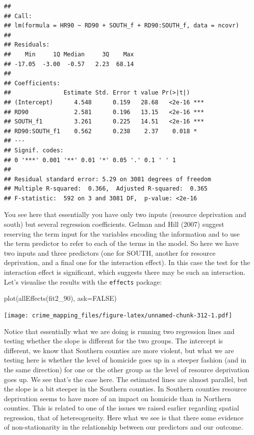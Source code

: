\documentclass[
  krantz2]{krantz}
\makeatletter
\newenvironment{Shaded}{\begin{snugshade}}{\end{snugshade}}
\newcommand{\AttributeTok}[1]{\textcolor[rgb]{0.61,0.61,0.61}{#1}}
\newcommand{\ConstantTok}[1]{\textcolor[rgb]{0,0,0}{#1}}
\newcommand{\FunctionTok}[1]{\textcolor[rgb]{0,0,0}{#1}}
\newcommand{\NormalTok}[1]{#1}
\newenvironment{kframe}{%
\medskip{}
\setlength{\fboxsep}{.8em}
 \def\at@end@of@kframe{}%
 \ifinner\ifhmode%
  \def\at@end@of@kframe{\end{minipage}}%
  \begin{minipage}{\columnwidth}%
 \fi\fi%
 \def\FrameCommand##1{\hskip\@totalleftmargin \hskip-\fboxsep
 \colorbox{shadecolor}{##1}\hskip-\fboxsep
     \hskip-\linewidth \hskip-\@totalleftmargin \hskip\columnwidth}%
 \MakeFramed {\advance\hsize-\width
   \@totalleftmargin\z@ \linewidth\hsize
   \@setminipage}}%
 {\par\unskip\endMakeFramed%
 \at@end@of@kframe}
\renewenvironment{Shaded}{\begin{kframe}}{\end{kframe}}
\makeatother
\begin{document}
\begin{verbatim}
## 
## Call:
## lm(formula = HR90 ~ RD90 + SOUTH_f + RD90:SOUTH_f, data = ncovr)
## 
## Residuals:
##    Min     1Q Median     3Q    Max 
## -17.05  -3.00  -0.57   2.23  68.14 
## 
## Coefficients:
##               Estimate Std. Error t value Pr(>|t|)    
## (Intercept)      4.548      0.159   28.68   <2e-16 ***
## RD90             2.581      0.196   13.15   <2e-16 ***
## SOUTH_f1         3.261      0.225   14.51   <2e-16 ***
## RD90:SOUTH_f1    0.562      0.238    2.37    0.018 *  
## ---
## Signif. codes:  
## 0 '***' 0.001 '**' 0.01 '*' 0.05 '.' 0.1 ' ' 1
## 
## Residual standard error: 5.29 on 3081 degrees of freedom
## Multiple R-squared:  0.366,  Adjusted R-squared:  0.365 
## F-statistic:  592 on 3 and 3081 DF,  p-value: <2e-16
\end{verbatim}

You see here that essentially you have only two inputs (resource deprivation and south) but several regression coefficients. Gelman and Hill (2007) suggest reserving the term input for the variables encoding the information and to use the term predictor to refer to each of the terms in the model. So here we have two inputs and three predictors (one for SOUTH, another for resource deprivation, and a final one for the interaction effect). In this case the test for the interaction effect is significant, which suggests there may be such an interaction. Let's visualise the results with the \texttt{effects} package:

\begin{Shaded}
\begin{Highlighting}[]
\FunctionTok{plot}\NormalTok{(}\FunctionTok{allEffects}\NormalTok{(fit2\_90), }\AttributeTok{ask=}\ConstantTok{FALSE}\NormalTok{)}
\end{Highlighting}
\end{Shaded}

\texttt{[image: crime\_mapping\_files/figure-latex/unnamed-chunk-312-1.pdf]}

Notice that essentially what we are doing is running two regression lines and testing whether the slope is different for the two groups. The intercept is different, we know that Southern counties are more violent, but what we are testing here is whether the level of homicide goes up in a steeper fashion (and in the same direction) for one or the other group as the level of resource deprivation goes up. We see that's the case here. The estimated lines are almost parallel, but the slope is a bit steeper in the Southern counties. In Southern counties resource deprivation seems to have more of an impact on homicide than in Northern counties. This is related to one of the issues we raised earlier regarding spatial regression, that of hetereogeneity. Here what we see is that there some evidence of non-stationarity in the relationship between our predictors and our outcome.
\end{document}
